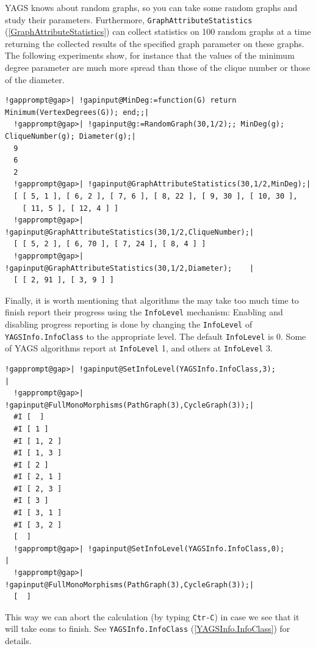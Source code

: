 \documentclass[a4paper,11pt]{report}
\begin{document}
{{\textsf{YAGS} knows about random graphs, so you can take some random graphs and study their
parameters. Furthermore, \texttt{GraphAttributeStatistics} (\ref{GraphAttributeStatistics}) can collect statistics on 100 random graphs at a time returning the collected
results of the specified graph parameter on these graphs. The following experiments show, for instance that the values of the minimum
degree parameter are much more spread than those of the clique number or those
of the diameter. 

 
\begin{Verbatim}[commandchars=!@|,fontsize=\small,frame=single,label=Example]
  !gapprompt@gap>| !gapinput@MinDeg:=function(G) return Minimum(VertexDegrees(G)); end;;|
  !gapprompt@gap>| !gapinput@g:=RandomGraph(30,1/2);; MinDeg(g); CliqueNumber(g); Diameter(g);|
  9
  6
  2
  !gapprompt@gap>| !gapinput@GraphAttributeStatistics(30,1/2,MinDeg);|
  [ [ 5, 1 ], [ 6, 2 ], [ 7, 6 ], [ 8, 22 ], [ 9, 30 ], [ 10, 30 ], 
    [ 11, 5 ], [ 12, 4 ] ]
  !gapprompt@gap>| !gapinput@GraphAttributeStatistics(30,1/2,CliqueNumber);|
  [ [ 5, 2 ], [ 6, 70 ], [ 7, 24 ], [ 8, 4 ] ]
  !gapprompt@gap>| !gapinput@GraphAttributeStatistics(30,1/2,Diameter);    |
  [ [ 2, 91 ], [ 3, 9 ] ]
\end{Verbatim}
 

Finally, it is worth mentioning that algorithms the may take too much time to
finish report their progress using the \texttt{InfoLevel} mechanism: Enabling and disabling progress reporting is done by changing the \texttt{InfoLevel} of \texttt{YAGSInfo.InfoClass} to the appropriate level. The default \texttt{InfoLevel} is 0. Some of \textsf{YAGS} algorithms report at \texttt{InfoLevel} 1, and others at \texttt{InfoLevel} 3. 

 
\begin{Verbatim}[commandchars=!@|,fontsize=\small,frame=single,label=Example]
  !gapprompt@gap>| !gapinput@SetInfoLevel(YAGSInfo.InfoClass,3);           |
  !gapprompt@gap>| !gapinput@FullMonoMorphisms(PathGraph(3),CycleGraph(3));|
  #I [  ]
  #I [ 1 ]
  #I [ 1, 2 ]
  #I [ 1, 3 ]
  #I [ 2 ]
  #I [ 2, 1 ]
  #I [ 2, 3 ]
  #I [ 3 ]
  #I [ 3, 1 ]
  #I [ 3, 2 ]
  [  ]
  !gapprompt@gap>| !gapinput@SetInfoLevel(YAGSInfo.InfoClass,0);           |
  !gapprompt@gap>| !gapinput@FullMonoMorphisms(PathGraph(3),CycleGraph(3));|
  [  ]
\end{Verbatim}
 

This way we can abort the calculation (by typing \texttt{Ctr-C}) in case we see that it will take eons to finish. See \texttt{YAGSInfo.InfoClass} (\ref{YAGSInfo.InfoClass}) for details. }

}
\end{document}
